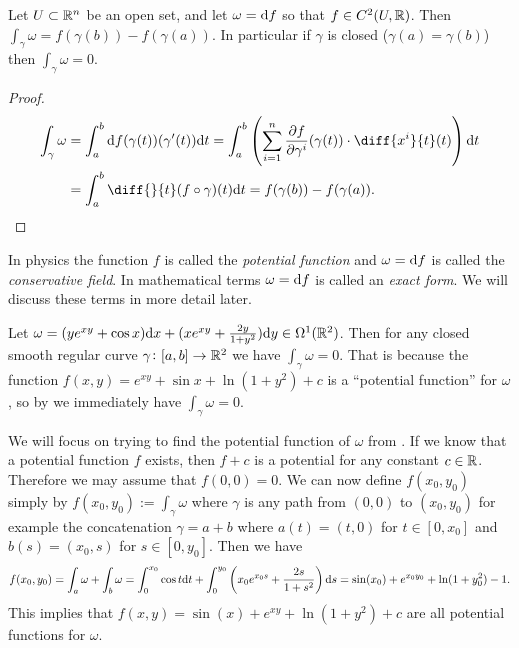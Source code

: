 \documentclass[11pt,a4paper]{article}
\begin{document}
\begin{proposition}
  \label{prop:conservative-vector-field}
  Let $U \subset \mathbb{R}^n$ be an open set,
  and let $\omega = \mathrm{d} f$ so that $f \in C^2(U,\mathbb{R})$.
  Then $\int_{\gamma} \omega = f(\gamma(b)) - f(\gamma(a))$.
  In particular if $\gamma$ is closed ($\gamma(a) = \gamma(b)$) then
  $\int_{\gamma} \omega = 0$.
\end{proposition}
\begin{proof}
  \begin{align*}
    \int_{\gamma} \omega &=
    \int_{a}^{b} \dif f(\gamma(t))(\gamma'(t)) \dt =
    \int_{a}^{b} \del{\sum_{i=1}^{n} \frac{\partial f}{\partial \gamma^i}(\gamma(t)) \cdot \diff{{x^i}}{t}(t)} \dt \\ &=
    \int_{a}^{b} \diff{}{t} (f \circ \gamma)(t) \dt =
    f(\gamma(b)) - f(\gamma(a)).
  \end{align*}
\end{proof}

\begin{remark}
  In physics the function $f$ is called the \textit{potential function}
  and $\omega = \mathrm{d} f$ is called the \textit{conservative field}.
  In mathematical terms $\omega = \mathrm{d} f$ is called an \textit{exact form}.
  We will discuss these terms in more detail later.
\end{remark}

\begin{example}
  \label{exmp:conservative-vector-field}
  Let $\omega = (y e^{xy} + \cos x) \dx + (x e^{xy} + \frac{2y}{1 + y^2}) \dy
  \in \Omega^1(\R^2)$.
  Then for any closed smooth regular curve
  $\gamma \colon [a,b] \to \mathbb{R}^2$ we have $\int_{\gamma} \omega = 0$.
  That is because the function $f(x,y) = e^{xy} + \sin x + \ln(1 + y^2) + c$
  is a ``potential function'' for $\omega$,
  so by  we immediately have
  $\int_{\gamma} \omega = 0$.
\end{example}

\begin{remark}
  \label{prop:conservative-other-direction}
  We will focus on trying to find the potential function of $\omega$
  from .
  If we know that a potential function $f$ exists,
  then $f + c$ is a potential for any constant $c \in \mathbb{R}$.
  Therefore we may assume that $f(0,0) = 0$.
  We can now define $f(x_0,y_0)$ simply by $f(x_0,y_0) := \int_{\gamma} \omega$
  where $\gamma$ is any path from $(0,0)$ to $(x_0,y_0)$ for example
  the concatenation $\gamma = a + b$ where $a(t) = (t,0)$
  for $t \in [0,x_0]$ and $b(s) = (x_0,s)$ for $s \in [0,y_0]$.
  Then we have
  \[
    f(x_0,y_0) =
    \int_{a} \omega + \int_{b} \omega =
    \int_{0}^{x_0} \cos t \dt +
    \int_{0}^{y_0} \del{x_0 e^{x_0 s} + \frac{2s}{1 + s^2}} \ds =
    \sin(x_0) + e^{x_0 y_0} + \ln(1 + y_0^2) - 1.
  \]
  This implies that $f(x,y) = \sin(x) + e^{xy} + \ln(1 + y^2) + c$
  are all potential functions for $\omega$.
\end{remark}
\end{document}
